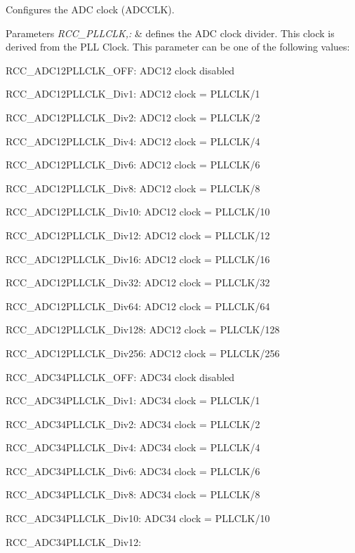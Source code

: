 Configures the A\-D\-C clock (A\-D\-C\-C\-L\-K). 


\begin{DoxyParams}{Parameters}
{\em R\-C\-C\-\_\-\-P\-L\-L\-C\-L\-K,\-:} & defines the A\-D\-C clock divider. This clock is derived from the P\-L\-L Clock. This parameter can be one of the following values\-: \begin{DoxyItemize}
\item R\-C\-C\-\_\-\-A\-D\-C12\-P\-L\-L\-C\-L\-K\-\_\-\-O\-F\-F\-: A\-D\-C12 clock disabled \item R\-C\-C\-\_\-\-A\-D\-C12\-P\-L\-L\-C\-L\-K\-\_\-\-Div1\-: A\-D\-C12 clock = P\-L\-L\-C\-L\-K/1 \item R\-C\-C\-\_\-\-A\-D\-C12\-P\-L\-L\-C\-L\-K\-\_\-\-Div2\-: A\-D\-C12 clock = P\-L\-L\-C\-L\-K/2 \item R\-C\-C\-\_\-\-A\-D\-C12\-P\-L\-L\-C\-L\-K\-\_\-\-Div4\-: A\-D\-C12 clock = P\-L\-L\-C\-L\-K/4 \item R\-C\-C\-\_\-\-A\-D\-C12\-P\-L\-L\-C\-L\-K\-\_\-\-Div6\-: A\-D\-C12 clock = P\-L\-L\-C\-L\-K/6 \item R\-C\-C\-\_\-\-A\-D\-C12\-P\-L\-L\-C\-L\-K\-\_\-\-Div8\-: A\-D\-C12 clock = P\-L\-L\-C\-L\-K/8 \item R\-C\-C\-\_\-\-A\-D\-C12\-P\-L\-L\-C\-L\-K\-\_\-\-Div10\-: A\-D\-C12 clock = P\-L\-L\-C\-L\-K/10 \item R\-C\-C\-\_\-\-A\-D\-C12\-P\-L\-L\-C\-L\-K\-\_\-\-Div12\-: A\-D\-C12 clock = P\-L\-L\-C\-L\-K/12 \item R\-C\-C\-\_\-\-A\-D\-C12\-P\-L\-L\-C\-L\-K\-\_\-\-Div16\-: A\-D\-C12 clock = P\-L\-L\-C\-L\-K/16 \item R\-C\-C\-\_\-\-A\-D\-C12\-P\-L\-L\-C\-L\-K\-\_\-\-Div32\-: A\-D\-C12 clock = P\-L\-L\-C\-L\-K/32 \item R\-C\-C\-\_\-\-A\-D\-C12\-P\-L\-L\-C\-L\-K\-\_\-\-Div64\-: A\-D\-C12 clock = P\-L\-L\-C\-L\-K/64 \item R\-C\-C\-\_\-\-A\-D\-C12\-P\-L\-L\-C\-L\-K\-\_\-\-Div128\-: A\-D\-C12 clock = P\-L\-L\-C\-L\-K/128 \item R\-C\-C\-\_\-\-A\-D\-C12\-P\-L\-L\-C\-L\-K\-\_\-\-Div256\-: A\-D\-C12 clock = P\-L\-L\-C\-L\-K/256 \item R\-C\-C\-\_\-\-A\-D\-C34\-P\-L\-L\-C\-L\-K\-\_\-\-O\-F\-F\-: A\-D\-C34 clock disabled \item R\-C\-C\-\_\-\-A\-D\-C34\-P\-L\-L\-C\-L\-K\-\_\-\-Div1\-: A\-D\-C34 clock = P\-L\-L\-C\-L\-K/1 \item R\-C\-C\-\_\-\-A\-D\-C34\-P\-L\-L\-C\-L\-K\-\_\-\-Div2\-: A\-D\-C34 clock = P\-L\-L\-C\-L\-K/2 \item R\-C\-C\-\_\-\-A\-D\-C34\-P\-L\-L\-C\-L\-K\-\_\-\-Div4\-: A\-D\-C34 clock = P\-L\-L\-C\-L\-K/4 \item R\-C\-C\-\_\-\-A\-D\-C34\-P\-L\-L\-C\-L\-K\-\_\-\-Div6\-: A\-D\-C34 clock = P\-L\-L\-C\-L\-K/6 \item R\-C\-C\-\_\-\-A\-D\-C34\-P\-L\-L\-C\-L\-K\-\_\-\-Div8\-: A\-D\-C34 clock = P\-L\-L\-C\-L\-K/8 \item R\-C\-C\-\_\-\-A\-D\-C34\-P\-L\-L\-C\-L\-K\-\_\-\-Div10\-: A\-D\-C34 clock = P\-L\-L\-C\-L\-K/10 \item R\-C\-C\-\_\-\-A\-D\-C34\-P\-L\-L\-C\-L\-K\-\_\-\-Div12\-: 
\end{DoxyItemize}
\end{DoxyParams}
